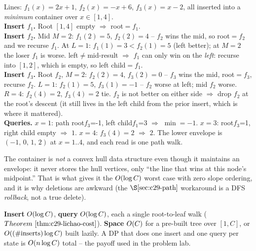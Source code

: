 \begin{tracebox}[Inserting three lines over the domain x=1 to 4, then reading points]
Lines: \(f_1(x)=2x+1\), \(f_2(x)=-x+6\), \(f_3(x)=x-2\), all inserted into a
\emph{minimum} container over \(x\in[1,4]\).\\
\textbf{Insert \(f_1\).} Root \([1,4]\) empty \(\Rightarrow\) root\(=f_1\).\\
\textbf{Insert \(f_2\).} Mid \(M=2\): \(f_1(2)=5\), \(f_2(2)=4\) -- \(f_2\) wins
the mid, so root\(=f_2\) and we recurse \(f_1\). At \(L=1\): \(f_1(1)=3<f_2(1)=5\)
(left better); at \(M=2\) the loser \(f_1\) is worse. left\(\ne\)mid-result
\(\Rightarrow\) \(f_1\) can only win on the \emph{left}: recurse into \([1,2]\),
which is empty, so left child\(=f_1\).\\
\textbf{Insert \(f_3\).} Root \(f_2\), \(M=2\): \(f_2(2)=4\), \(f_3(2)=0\) --
\(f_3\) wins the mid, root\(=f_3\), recurse \(f_2\). \(L=1\): \(f_2(1)=5\),
\(f_3(1)=-1\) -- \(f_2\) worse at left; mid \(f_2\) worse. \(R=4\): \(f_2(4)=2\),
\(f_3(4)=2\) tie. \(f_2\) is not better on either side \(\Rightarrow\) drop
\(f_2\) at the root's descent (it still lives in the left child from the prior
insert, which is where it mattered).\\
\textbf{Queries.} \(x{=}1\): path root\(f_3\)=-1, left child\(f_1\)=3 \(\Rightarrow\)
\(\min=-1\).  \(x{=}3\): root\(f_3\)=1, right child empty \(\Rightarrow\) \(1\).
\(x{=}4\): \(f_3(4)=2\) \(\Rightarrow\) \(2\).  The lower envelope is
\((-1,\,0,\,1,\,2)\) at \(x=1..4\), and each read is one path walk.
\end{tracebox}

\begin{observation}
The container is \emph{not} a convex hull data structure even though it maintains
an envelope: it never stores the hull vertices, only ``the line that wins at this
node's midpoint.'' That is what gives it the \(O(\log C)\) worst case with
zero slope ordering, and it is why deletions are awkward (the \(\secref{c29-path}\)
workaround is a DFS \emph{rollback}, not a true delete).
\end{observation}

\begin{complexitybox}
\textbf{Insert} \(O(\log C)\), \textbf{query} \(O(\log C)\), each a
single root-to-leaf walk (\(\thmref{c29-lichao-cost}\)). \textbf{Space} \(O(C)\)
for a pre-built tree over \([1,C]\), or \(O((\#\text{inserts})\log C)\) built
lazily. A DP that does one insert and one query per state is \(O(n\log C)\)
total -- the payoff used in the problem lab.
\end{complexitybox}

